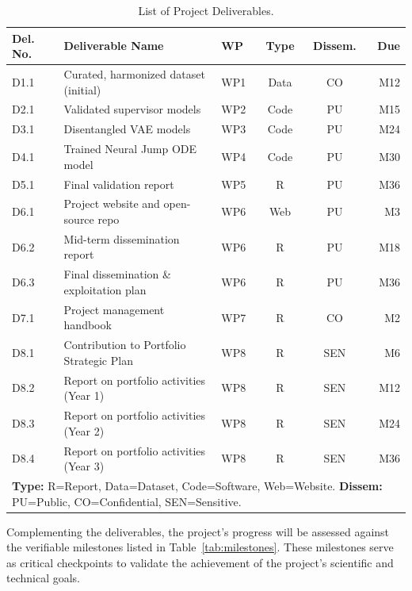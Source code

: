 \documentclass[11pt, a4paper]{article}
\begin{document}
\begin{table}[H]
    \centering
    \caption{List of Project Deliverables.}
    \label{tab:deliverables}
    \small
    \begin{tabular}{lp{5.5cm}lccr}
        \toprule
        \textbf{Del. No.} & \textbf{Deliverable Name} & \textbf{WP} & \textbf{Type} & \textbf{Dissem.} & \textbf{Due} \\
        \midrule
        D1.1 & Curated, harmonized dataset (initial) & WP1 & Data & CO & M12 \\
        D2.1 & Validated supervisor models & WP2 & Code & PU & M15 \\
        D3.1 & Disentangled VAE models & WP3 & Code & PU & M24 \\
        D4.1 & Trained Neural Jump ODE model & WP4 & Code & PU & M30 \\
        D5.1 & Final validation report & WP5 & R & PU & M36 \\
        D6.1 & Project website and open-source repo & WP6 & Web & PU & M3 \\
        D6.2 & Mid-term dissemination report & WP6 & R & PU & M18 \\
        D6.3 & Final dissemination \& exploitation plan & WP6 & R & PU & M36 \\
        D7.1 & Project management handbook & WP7 & R & CO & M2 \\
        D8.1 & Contribution to Portfolio Strategic Plan & WP8 & R & SEN & M6 \\
        D8.2 & Report on portfolio activities (Year 1) & WP8 & R & SEN & M12 \\
        D8.3 & Report on portfolio activities (Year 2) & WP8 & R & SEN & M24 \\
        D8.4 & Report on portfolio activities (Year 3) & WP8 & R & SEN & M36 \\
        \bottomrule
        \multicolumn{6}{p{13cm}}{\footnotesize \textbf{Type:} R=Report, Data=Dataset, Code=Software, Web=Website. \textbf{Dissem:} PU=Public, CO=Confidential, SEN=Sensitive.}
    \end{tabular}
\end{table}

Complementing the deliverables, the project's progress will be assessed against the verifiable milestones listed in Table~\ref{tab:milestones}. These milestones serve as critical checkpoints to validate the achievement of the project's scientific and technical goals.
\end{document}
